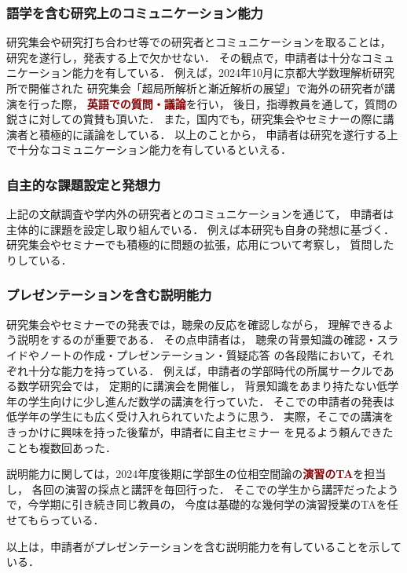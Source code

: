 \documentclass[10pt,a4paper,uplatex,dvipdfmx]{ujarticle} 		%
\newcommand{\研究課題名}{打切り超局所台の関手的性質の研究とMorse理論への応用}
\newcommand{\研究機関名}{北海道大学}
\newcommand{\研究代表者氏名}{大柴寿浩}
\begin{document}
\subsubsection*{語学を含む研究上のコミュニケーション能力}
研究集会や研究打ち合わせ等での研究者とコミュニケーションを取ることは，
研究を遂行し，発表する上で欠かせない．
その観点で，申請者は十分なコミュニケーション能力を有している．
例えば，2024年10月に京都大学数理解析研究所で開催された
研究集会「超局所解析と漸近解析の展望」で海外の研究者が講演を行った際，
\textcolor{darkred}{\textbf{英語での質問・議論}}を行い，
後日，指導教員を通して，質問の鋭さに対しての賞賛も頂いた．
また，国内でも，研究集会やセミナーの際に講演者と積極的に議論をしている．
以上のことから，
申請者は研究を遂行する上で十分なコミュニケーション能力を有しているといえる．

\subsubsection*{自主的な課題設定と発想力}
上記の文献調査や学内外の研究者とのコミュニケーションを通じて，
申請者は主体的に課題を設定し取り組んでいる．
例えば本研究も自身の発想に基づく．
研究集会やセミナーでも積極的に問題の拡張，応用について考察し，
質問したりしている．

\subsubsection*{プレゼンテーションを含む説明能力}
研究集会やセミナーでの発表では，聴衆の反応を確認しながら，
理解できるよう説明をするのが重要である．
その点申請者は，
聴衆の背景知識の確認・スライドやノートの作成・プレゼンテーション・質疑応答
の各段階において，それぞれ十分な能力を持っている．
例えば，申請者の学部時代の所属サークルである数学研究会では，
定期的に講演会を開催し，
背景知識をあまり持たない低学年の学生向けに少し進んだ数学の講演を行っていた．
そこでの申請者の発表は低学年の学生にも広く受け入れられていたように思う．
実際，そこでの講演をきっかけに興味を持った後輩が，申請者に自主セミナー
を見るよう頼んできたことも複数回あった．

説明能力に関しては，2024年度後期に学部生の位相空間論の\textcolor{darkred}{\textbf{演習のTA}}を担当し，
各回の演習の採点と講評を毎回行った．
そこでの学生から講評だったようで，今学期に引き続き同じ教員の，
今度は基礎的な幾何学の演習授業のTAを任せてもらっている．

以上は，申請者がプレゼンテーションを含む説明能力を有していることを示している．
\end{document}
